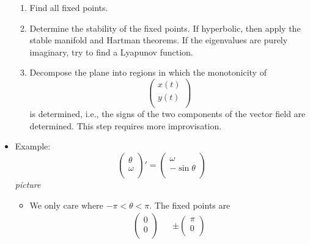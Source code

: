 \documentclass[../notes.tex]{subfiles}
\begin{document}
\begin{itemize}
    \begin{enumerate}
        \item Find all fixed points.
        \item Determine the stability of the fixed points. If hyperbolic, then apply the stable manifold and Hartman theorems. If the eigenvalues are purely imaginary, try to find a Lyapunov function.
        \item Decompose the plane into regions in which the monotonicity of
        \begin{equation*}
            \begin{pmatrix}
                x(t)\\
                y(t)\\
            \end{pmatrix}
        \end{equation*}
        is determined, i.e., the signs of the two components of the vector field are determined. This step requires more improvisation.
    \end{enumerate}
    \item Example:
    \begin{equation*}
        \begin{pmatrix}
            \theta\\
            \omega\\
        \end{pmatrix}'
        =
        \begin{pmatrix}
            \omega\\
            -\sin\theta\\
        \end{pmatrix}
    \end{equation*}
    \emph{picture}
    \begin{itemize}
        \item We only care where $-\pi<\theta<\pi$. The fixed points are
        \begin{align*}
            \begin{pmatrix}
                0\\
                0\\
            \end{pmatrix}&&
            \pm
            \begin{pmatrix}
                \pi\\
                0\\
            \end{pmatrix}
        \end{align*}

\end{itemize}
\end{itemize}
\end{document}
